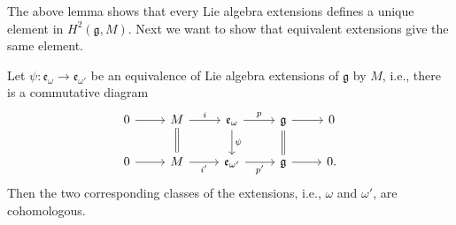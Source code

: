 The above lemma shows that every Lie algebra extensions defines a unique element in $ H^2(\mathfrak{g}, M) $. Next we want to show that equivalent extensions give the same element.

\begin{lemma}
  Let $ \psi: \mathfrak{e}_\omega \to \mathfrak{e}_{\omega'} $ be an equivalence of Lie algebra extensions of $ \mathfrak{g} $ by $ M $, i.e., there is a commutative diagram
  \[\begin{tikzcd}
	  0 & M & {\mathfrak{e}_\omega} & {\mathfrak{g}} & 0 \\
	  0 & M & {\mathfrak{e}_{\omega'}} & {\mathfrak{g}} & 0.
	  \arrow[Rightarrow, no head, from=1-4, to=2-4]
	  \arrow["\psi", from=1-3, to=2-3]
	  \arrow[from=1-1, to=1-2]
	  \arrow["i", from=1-2, to=1-3]
	  \arrow["p", from=1-3, to=1-4]
	  \arrow[from=1-4, to=1-5]
	  \arrow["{i'}"', from=2-2, to=2-3]
	  \arrow["{p'}"', from=2-3, to=2-4]
	  \arrow[from=2-1, to=2-2]
	  \arrow[from=2-4, to=2-5]
	  \arrow[Rightarrow, no head, from=1-2, to=2-2]
  \end{tikzcd}\]
  Then the two corresponding classes of the extensions, i.e., $ \omega $ and $ \omega' $, are cohomologous.
\end{lemma}
